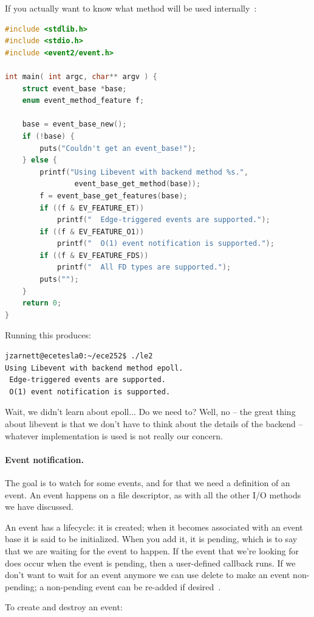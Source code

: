 If you actually want to know what method will be used internally~\cite{libevent}:
\begin{lstlisting}[language=C]
#include <stdlib.h>
#include <stdio.h>
#include <event2/event.h>

int main( int argc, char** argv ) { 
    struct event_base *base;
    enum event_method_feature f;

    base = event_base_new();
    if (!base) {
        puts("Couldn't get an event_base!");
    } else {
        printf("Using Libevent with backend method %s.",
                event_base_get_method(base));
        f = event_base_get_features(base);
        if ((f & EV_FEATURE_ET))
            printf("  Edge-triggered events are supported.");
        if ((f & EV_FEATURE_O1))
            printf("  O(1) event notification is supported.");
        if ((f & EV_FEATURE_FDS))
            printf("  All FD types are supported.");
        puts("");
    }   
    return 0;
}
\end{lstlisting}

Running this produces:
\begin{verbatim}
jzarnett@ecetesla0:~/ece252$ ./le2
Using Libevent with backend method epoll.  
 Edge-triggered events are supported.  
 O(1) event notification is supported.
\end{verbatim}

Wait, we didn't learn about epoll... Do we need to? Well, no -- the great thing about libevent is that we don't have to think about the details of the backend -- whatever implementation is used is not really our concern.

\paragraph{Event notification.} The goal is to watch for some events, and for that we need a definition of an event. An event happens on a file descriptor, as with all the other I/O methods we have discussed.

An event has a lifecycle: it is created; when it becomes associated with an event base it is said to be initialized. When you add it, it is pending, which is to say that we are waiting for the event to happen. If the event that we're looking for does occur when the event is pending, then a user-defined callback runs. If we don't want to wait for an event anymore we can use delete to make an event non-pending; a non-pending event can be re-added if desired~\cite{libevent}.

To create and destroy an event:

